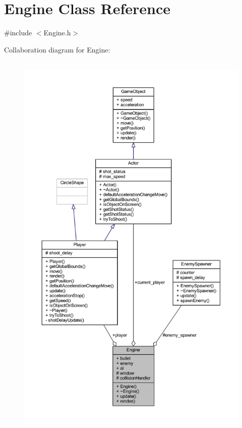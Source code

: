 \hypertarget{class_engine}{}\section{Engine Class Reference}
\label{class_engine}


{\ttfamily \#include $<$Engine.\+h$>$}



Collaboration diagram for Engine\+:\nopagebreak
\begin{figure}[H]
\begin{center}
\leavevmode
\includegraphics[height=550pt]{class_engine__coll__graph}
\end{center}
\end{figure}

